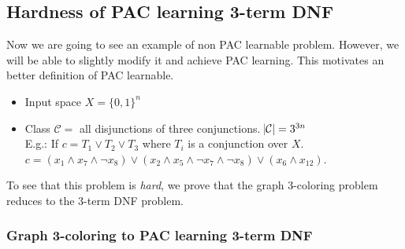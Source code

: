 \documentclass[12pt, letterpaper]{article}
\numberwithin{equation}{section} %
\newcommand{\mc}{\mathcal}
\theoremstyle{definition}
\theoremstyle{remark}
\begin{document}
\subsection{Hardness of PAC learning 3-term DNF}

Now we are going to see an example of non PAC learnable problem. 
However, we will be able to slightly modify it and achieve PAC learning. 
This motivates an better definition of PAC learnable.
\begin{itemize}
    \item Input space $X = \lbrace 0, 1 \rbrace^n$
    \item Class $\mc C = $ all disjunctions of three conjunctions. $\abs{\mc C} = 3^{3n}$\\
          E.g.: If $c = T_1 \lor T_2 \lor T_3$ where $T_i$ is a conjunction over $X$.\\
          $c = \left(x_1 \wedge x_7 \wedge \lnot x_8 \right) \lor \left(x_2 \wedge x_5 \wedge \lnot x_7 \wedge \lnot x_8\right) \lor \left(x_6 \wedge x_{12}\right)$.
\end{itemize}
To see that this problem is \emph{hard}, we prove that the graph 3-coloring problem reduces to the 3-term DNF problem. 

\subsubsection*{Graph 3-coloring to PAC learning 3-term DNF}
\end{document}
